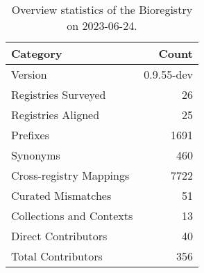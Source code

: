 \begin{table}
\caption{Overview statistics of the Bioregistry on 2023-06-24.}
\label{tab:bioregistry-summary}
\begin{tabular}{lr}
\toprule
Category & Count \\
\midrule
Version & 0.9.55-dev \\
Registries Surveyed & 26 \\
Registries Aligned & 25 \\
Prefixes & 1691 \\
Synonyms & 460 \\
Cross-registry Mappings & 7722 \\
Curated Mismatches & 51 \\
Collections and Contexts & 13 \\
Direct Contributors & 40 \\
Total Contributors & 356 \\
\bottomrule
\end{tabular}
\end{table}
